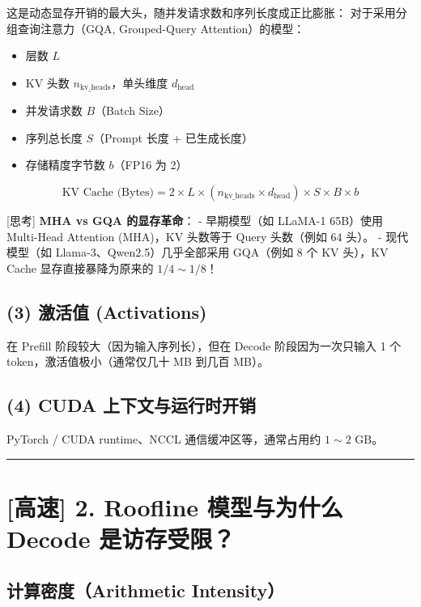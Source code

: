 这是动态显存开销的最大头，随并发请求数和序列长度成正比膨胀：
对于采用分组查询注意力（GQA, Grouped-Query Attention）的模型：
\begin{itemize}
  \item 层数 $L$
  \item KV 头数 $n_{\text{kv\_heads}}$，单头维度 $d_{\text{head}}$
  \item 并发请求数 $B$（Batch Size）
  \item 序列总长度 $S$（Prompt 长度 + 已生成长度）
  \item 存储精度字节数 $b$（FP16 为 2）
\end{itemize}

\[
\text{KV Cache (Bytes)} = 2 \times L \times (n_{\text{kv\_heads}} \times d_{\text{head}}) \times S \times B \times b
\]

\begin{tipBox}[核心直觉与思考]
{}[思考] \textbf{MHA vs GQA 的显存革命}：
- 早期模型（如 LLaMA-1 65B）使用 Multi-Head Attention (MHA)，KV 头数等于 Query 头数（例如 64 头）。
- 现代模型（如 Llama-3、Qwen2.5）几乎全部采用 GQA（例如 8 个 KV 头），KV Cache 显存直接暴降为原来的 $1/4 \sim 1/8$！
\end{tipBox}

\subsection{(3) 激活值 (Activations)}

在 Prefill 阶段较大（因为输入序列长），但在 Decode 阶段因为一次只输入 1 个 token，激活值极小（通常仅几十 MB 到几百 MB）。

\subsection{(4) CUDA 上下文与运行时开销}

PyTorch / CUDA runtime、NCCL 通信缓冲区等，通常占用约 $1 \sim 2 \text{ GB}$。

\vspace{0.8em}\hrule\vspace{0.8em}

\section{[高速] 2. Roofline 模型与为什么 Decode 是访存受限？}

\subsection{计算密度（Arithmetic Intensity）}

